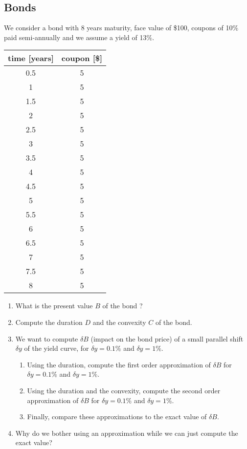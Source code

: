\subsection*{Bonds}

We consider a bond with 8 years maturity, face value of \$100, coupons of 10\% paid semi-annually and we assume a yield of 13\%.

\begin{center}
\begin{tabular}{c|c}
time [years] & coupon [\$] \\
\hline
0.5 & 5 \\
1 & 5 \\
1.5 & 5 \\
2 & 5 \\
2.5 & 5 \\
3 & 5 \\
3.5 & 5 \\
4 & 5 \\
4.5 & 5 \\
5 & 5 \\
5.5 & 5 \\
6 & 5 \\
6.5 & 5 \\
7 & 5 \\
7.5 & 5 \\
8 & 5 \\
\end{tabular}
\end{center} 
 

\begin{enumerate}
    \item What is the present value $B$ of the bond ?
    \item Compute the duration $D$ and the convexity $C$ of the bond. 
    \item We want to compute $\delta B$ (impact on the bond price) of a small parallel shift $\delta y$ of the yield curve, for $\delta y = 0.1\%$ and $\delta y = 1\%$.
    \begin{enumerate}
        \item Using the duration, compute the first order approximation of $\delta B$ for $\delta y = 0.1\%$ and $\delta y = 1\%$.
        \item Using the duration and the convexity, compute the second order approximation of $\delta B$ for $\delta y = 0.1\%$ and $\delta y = 1\%$.
        \item Finally, compare these approximations to the exact value of $\delta B$.
    \end{enumerate}
    \item Why do we bother using an approximation while we can just compute the exact value?
\end{enumerate}

